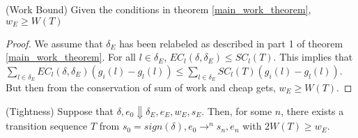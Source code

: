 \begin{theorem}
(Work Bound) Given the conditions in theorem \ref{main_work_theorem}, $w_E \geq W(T)$
\end{theorem}

\begin{proof}
We assume that $\delta_E$ has been relabeled as described in part 1 of theorem \ref{main_work_theorem}. For all $l \in \delta_E$, $EC_l(\delta, \delta_E) \leq SC_l(T)$. This implies that $\displaystyle \sum_{l \in \delta_E} EC_l(\delta, \delta_E) (g_i(l)-g_l(l)) \leq \sum_{l \in \delta_E} SC_l(T) (g_i(l)-g_l(l))$. But then from the conservation of sum of work and cheap gets, $w_E \geq W(T)$.
\end{proof}

\begin{theorem}
(Tightness) Suppose that $\delta, e_0 \Downarrow \delta_E, e_E, w_E, s_E$. Then, for some $n$, there exists a transition sequence $T$ from $s_0 = sign(\delta), e_0 \to^n s_n, e_n$ with $2W(T) \geq w_E$.
\end{theorem}

